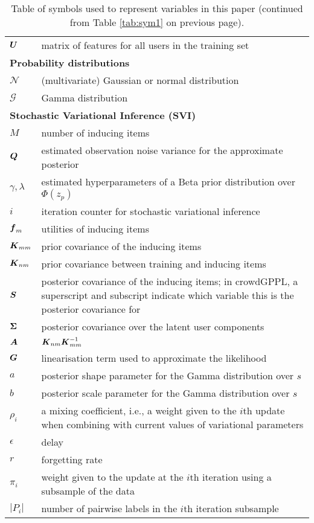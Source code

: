 \begin{table}
\begin{tabularx}{\columnwidth}{p{1.7cm} X }
 $\boldsymbol U$ & matrix of features for all users in the training set \\ 
 \multicolumn{2}{l}{\textbf{Probability distributions}} \\
 $\mathcal{N}$ & (multivariate) Gaussian or normal distribution \\
 $\mathcal{G}$ & Gamma distribution \\
 \multicolumn{2}{l}{\textbf{Stochastic Variational Inference (SVI) }} \\
 $M$ & number of inducing items \\
 $\boldsymbol Q$ & estimated observation noise variance for the approximate posterior \\
 $\gamma, \lambda$ & estimated hyperparameters of a Beta prior distribution over $\Phi(z_p)$ \\
 $i$ & iteration counter for stochastic variational inference \\
 $\boldsymbol f_m$ & utilities of inducing items \\
 $\boldsymbol K_{mm}$ & prior covariance of the inducing items \\
 $\boldsymbol K_{nm}$ & prior covariance between training and inducing items \\
 $\boldsymbol S$ & posterior covariance of the inducing items; in crowdGPPL, a superscript and subscript 
 indicate which variable this is the posterior covariance for \\
 $\boldsymbol \Sigma$ & posterior covariance over the latent user components \\
 $\boldsymbol A$ & $\boldsymbol K_{nm} \boldsymbol K_{mm}^{-1}$ \\
 $\boldsymbol G$ & linearisation term used to approximate the likelihood \\
 $a$ & posterior shape parameter for the Gamma distribution over $s$ \\
 $b$ & posterior scale parameter for the Gamma distribution over $s$ \\
 $\rho_i$ & a mixing coefficient, i.e., a weight given to the $i$th update when combining with current values of variational
 parameters \\
 $\epsilon$ & delay \\
 $r$ & forgetting rate \\
 $\pi_i$ & weight given to the update at the $i$th iteration using a subsample of the data \\
 $|P_i|$ & number of pairwise labels in the $i$th iteration subsample \\
 \bottomrule
 \end{tabularx}
 \caption{Table of symbols used to represent variables in this paper (continued from Table \ref{tab:sym1} on previous page).}
 \label{tab:sym2}
\end{table}
